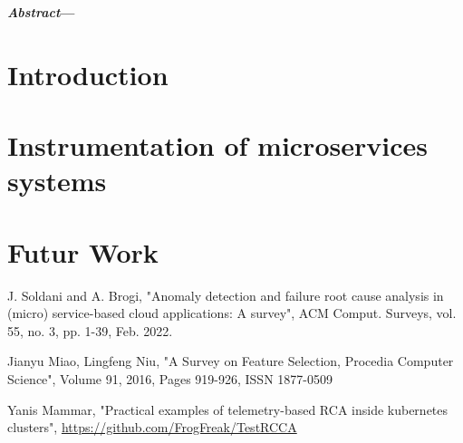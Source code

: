 \documentclass[
    11pt,
    english,
    a4paper
]{article}
\begin{document}
\pagestyle{empty}
\marginlayout
\maketitle

\setlength\columnsep{10pt}
\begin{multicols}{2}

{
\bfseries
\noindent \emph{Abstract}---
}

\section{Introduction}


\section{Instrumentation of microservices systems}


\section{Futur Work}


\begin{thebibliography}{1}
J. Soldani and A. Brogi, "Anomaly detection and failure root cause analysis in (micro) service-based cloud applications: A survey", ACM Comput. Surveys, vol. 55, no. 3, pp. 1-39, Feb. 2022.

Jianyu Miao, Lingfeng Niu, "A Survey on Feature Selection, Procedia Computer Science", Volume 91, 2016, Pages 919-926, ISSN 1877-0509

Yanis Mammar, "Practical examples of telemetry-based RCA inside kubernetes clusters", \href{https://github.com/FrogFreak/TestRCCA}{https://github.com/FrogFreak/TestRCCA}

\end{thebibliography}

\end{multicols}
\end{document}
